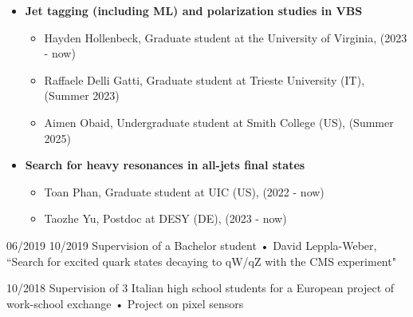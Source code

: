 {\begin{itemize}
\begin{itemize}
    \item Jack Peltier, Undergraduate student at Tennessee University, Knoxville (US),(Summer 2023)  
    \item Nicol\`{o} Salimbeni, Master student at University of Padova (IT), (2023 - now)
    \item Iqra Sohail, Graduate student at National Centre for Physics (PK) and LPC based, (2023 - now)
    \item Colby Thompson, Graduate student at Tennessee University, Knoxville (US),(Summer 2024)
    \item Adam Vendrasco, Graduate student at Tennessee University, Knoxville (US),(2025 - now)
    \item Sweta Baradia, Postdoc at UC Davis, California (US),(2025 - now)

    \end{itemize}
	\item {\bf Jet tagging (including ML) and polarization studies in VBS }
	\begin{itemize}
	\item Hayden Hollenbeck, Graduate student at the University of Virginia, (2023 - now)
	\item Raffaele Delli Gatti, Graduate student at Trieste University (IT), (Summer 2023)
	\item Aimen Obaid, Undergraduate student at Smith College (US), (Summer 2025)
	\end{itemize}
	\item {\bf Search for heavy resonances in all-jets final states}
	\begin{itemize}
	\item Toan Phan, Graduate student at UIC (US), (2022 - now)
	\item Taozhe Yu, Postdoc at DESY (DE), (2023 - now)
	\end{itemize}

    \end{itemize}
    }

  \teaching
    {06/2019 \textemdash{} 10/2019}
    {Supervision of a Bachelor student • }{David Leppla-Weber, ``Search for excited quark states decaying to qW/qZ with the CMS experiment"}
      
  \teaching
    {10/2018}
    {Supervision of 3 Italian high school students for a European project of work-school exchange • }
    {Project on pixel sensors}
\newpage
